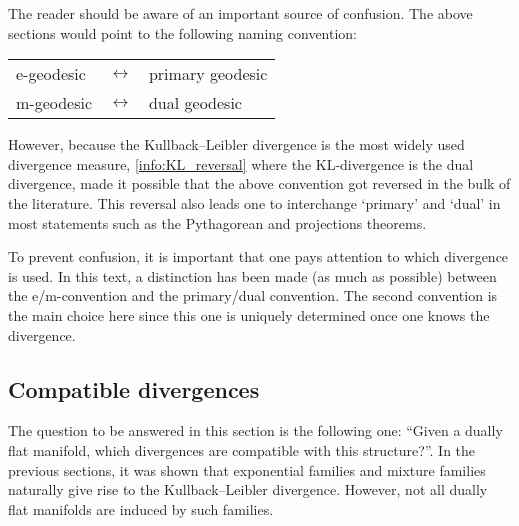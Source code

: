     \begin{remark}
        The reader should be aware of an important source of confusion. The above sections would point to the following naming convention:
        \begin{center}
            \begin{tabular}{lll}
                e-geodesic&$\leftrightarrow$&primary geodesic\\
                m-geodesic&$\leftrightarrow$&dual geodesic
            \end{tabular}
        \end{center}
        However, because the Kullback--Leibler divergence is the most widely used divergence measure, \cref{info:KL_reversal} where the KL-divergence is the dual divergence, made it possible that the above convention got reversed in the bulk of the literature. This reversal also leads one to interchange `primary' and `dual' in most statements such as the Pythagorean and projections theorems.

        To prevent confusion, it is important that one pays attention to which divergence is used. In this text, a distinction has been made (as much as possible) between the e/m-convention and the primary/dual convention. The second convention is the main choice here since this one is uniquely determined once one knows the divergence.
    \end{remark}

\subsection{Compatible divergences}

    The question to be answered in this section is the following one: ``Given a dually flat manifold, which divergences are compatible with this structure?''. In the previous sections, it was shown that exponential families and mixture families naturally give rise to the Kullback--Leibler divergence. However, not all dually flat manifolds are induced by such families.

